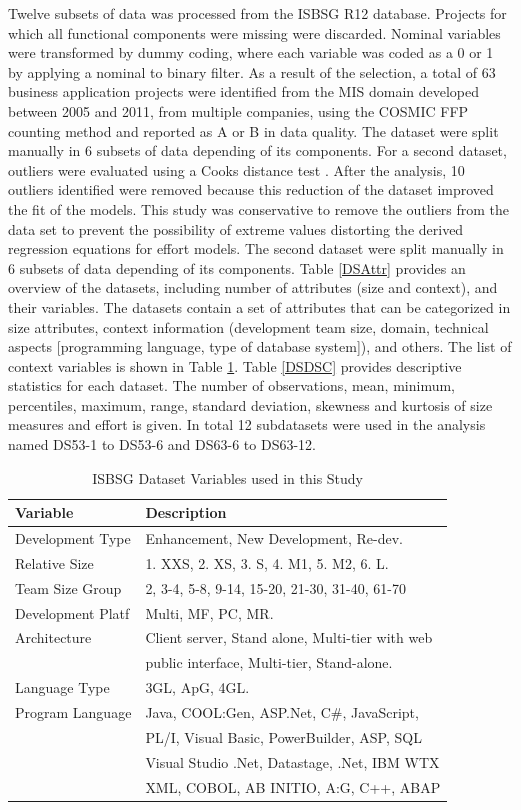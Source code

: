\documentclass[conference]{IEEEtran}
\begin{document}
Twelve subsets of data was processed from the ISBSG R12 database. Projects for which all functional components were missing were discarded. Nominal variables were transformed by dummy coding, where each variable was coded as a 0 or 1 by applying a nominal to binary filter. As a result of the selection, a total of 63 business application projects were identified from the MIS domain developed between 2005 and 2011, from multiple companies, using the COSMIC FFP counting method and reported as A or B in data quality. The dataset were split manually in 6 subsets of data depending of its components. For a second dataset, outliers were evaluated using a Cooks distance test \cite{Cook:2000}. After the analysis, 10 outliers identified were removed because this reduction of the dataset improved the fit of the models. This study was conservative to remove the outliers from the data set to prevent the possibility of extreme values distorting the derived regression equations for effort models. The second dataset were split manually in 6 subsets of data depending of its components. Table \ref{DSAttr} provides an overview of the datasets, including number of attributes (size and context), and their variables. The datasets contain a set of attributes that can be categorized in size attributes, context information (development team size, domain, technical aspects [programming language, type of database system]), and others. The list of context variables is shown in Table \ref{ISBSGDatasetVariablesStudy}. Table \ref{DSDSC} provides descriptive statistics for each dataset. The number of observations, mean, minimum, percentiles, maximum, range, standard deviation, skewness and kurtosis of size measures and effort is given. In total 12 subdatasets were used in the analysis named DS53-1 to DS53-6 and DS63-6 to DS63-12.

\begin{table}
\centering
\caption{ISBSG Dataset Variables used in this Study}
\label{ISBSGDatasetVariablesStudy}
\begin{tabular}{|l|l|}\hline
\textbf{Variable}&\textbf{Description}\\\hline
Development Type&Enhancement, New Development, Re-dev.\\
Relative Size&1. XXS, 2. XS, 3. S, 4. M1, 5. M2, 6. L.\\
Team Size Group&2, 3-4, 5-8, 9-14, 15-20, 21-30, 31-40, 61-70\\
Development Platf&Multi, MF, PC, MR.\\
Architecture&Client server, Stand alone, Multi-tier with web \\
&public interface, Multi-tier, Stand-alone.\\
Language Type&3GL, ApG, 4GL.\\
Program Language&Java, COOL:Gen, ASP.Net, C\#, JavaScript, \\
                 & PL/I, Visual Basic, PowerBuilder, ASP, SQL \\
                 &Visual Studio .Net, Datastage, .Net, IBM WTX \\
                 &XML, COBOL, AB INITIO, A:G, C++, ABAP\\\hline
\end{tabular}
\end{table}
\end{document}

